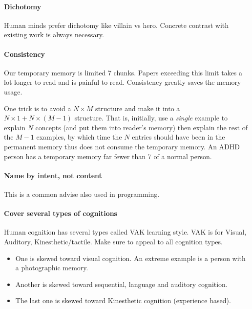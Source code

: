 \paragraph{Dichotomy}

Human minds prefer dichotomy like villain vs hero.
Concrete contrast with existing work is always necessary.

\paragraph{Consistency}

Our temporary memory is limited 7 chunks.
Papers exceeding this limit takes a lot longer to read and is painful to read.
Consistency greatly saves the memory usage.

One trick is to avoid a $N\times M$ structure and make it into a $N \times 1 + N \times (M-1)$ structure.
That is, initially, use a \emph{single} example to explain $N$ concepts (and put them into reader's memory)
then explain the rest of the $M-1$ examples, by which time the $N$ entries should have been in the permanent memory
thus does not consume the temporary memory.
An ADHD person has a temporary memory far fewer than 7 of a normal person.


\paragraph{Name by intent, not content}

This is a common advise also used in programming.

\paragraph{Cover several types of cognitions}

Human cognition has several types called VAK learning style.
VAK is for Visual, Auditory, Kinesthetic/tactile.
Make sure to appeal to all cognition types.

\begin{itemize}
 \item One is skewed toward visual cognition. An extreme example is a person with a photographic memory.
 \item Another is skewed toward sequential, language and auditory cognition.
 \item The last one is skewed toward Kinesthetic cognition (experience based).
\end{itemize}

